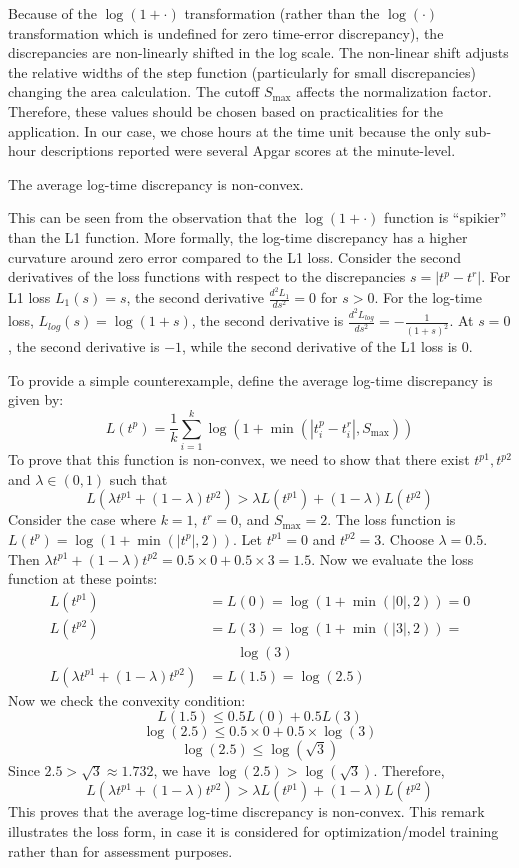 Because of the $\log(1 + \cdot)$ transformation (rather than the $\log(\cdot)$ transformation which is undefined for zero time-error discrepancy), the discrepancies are non-linearly shifted in the log scale.  The non-linear shift adjusts the relative widths of the step function (particularly for small discrepancies) changing the area calculation.  The cutoff $S_\text{max}$ affects the normalization factor.  Therefore, these values should be chosen based on practicalities for the application.  In our case, we chose hours at the time unit because the only sub-hour descriptions reported were several Apgar scores at the minute-level.

\begin{remark}
    The average log-time discrepancy is non-convex.
\end{remark}
This can be seen from the observation that the $\log(1+\cdot)$ function is ``spikier'' than the L1 function. More formally, the log-time discrepancy has a higher curvature around zero error compared to the L1 loss. Consider the second derivatives of the loss functions with respect to the discrepancies $s = |t^p - t^r|$.  For L1 loss $L_1(s) = s$, the second derivative $\frac{d^2 L_1}{ds^2} = 0$ for $s > 0$.
For the log-time loss, $L_{log}(s) = \log(1 + s)$, the second derivative is $\frac{d^2 L_{log}}{ds^2} = -\frac{1}{(1 + s)^2}$. At $s = 0$, the second derivative is $-1$, while the second derivative of the L1 loss is $0$.

To provide a simple counterexample, define the average log-time discrepancy is given by:
\[
L(t^p) = \frac{1}{k} \sum_{i=1}^k \log(1 + \min(|t^p_i - t^r_i|, S_{\text{max}}))
\]
To prove that this function is non-convex, we need to show that there exist $t^{p1}, t^{p2}$ and $\lambda \in (0,1)$ such that
\[
L(\lambda t^{p1} + (1-\lambda) t^{p2}) > \lambda L(t^{p1}) + (1-\lambda) L(t^{p2})
\]
Consider the case where $k=1$, $t^r = 0$, and $S_{\text{max}} = 2$. The loss function is $L(t^p) = \log(1 + \min(|t^p|, 2))$.
Let $t^{p1} = 0$ and $t^{p2} = 3$. Choose $\lambda = 0.5$.
Then $\lambda t^{p1} + (1-\lambda) t^{p2} = 0.5 \times 0 + 0.5 \times 3 = 1.5$.
Now we evaluate the loss function at these points:
\begin{align*}
L(t^{p1}) &= L(0) = \log(1 + \min(|0|, 2)) = 0 \\
L(t^{p2}) &= L(3) = \log(1 + \min(|3|, 2)) = \\
    & \qquad \log(3) \\
L(\lambda t^{p1} + (1-\lambda) t^{p2}) &= L(1.5) = \log(2.5)
\end{align*}
Now we check the convexity condition:
\[
L(1.5) \leq 0.5 L(0) + 0.5 L(3)
\]
\[
\log(2.5) \leq 0.5 \times 0 + 0.5 \times \log(3)
\]
\[
\log(2.5) \leq \log(\sqrt{3})
\]
Since $2.5 > \sqrt{3} \approx 1.732$, we have $\log(2.5) > \log(\sqrt{3})$.
Therefore,
\[
L(\lambda t^{p1} + (1-\lambda) t^{p2}) > \lambda L(t^{p1}) + (1-\lambda) L(t^{p2})
\]
This proves that the average log-time discrepancy is non-convex.
This remark illustrates the loss form, in case it is considered for optimization/model training rather than for assessment purposes.

